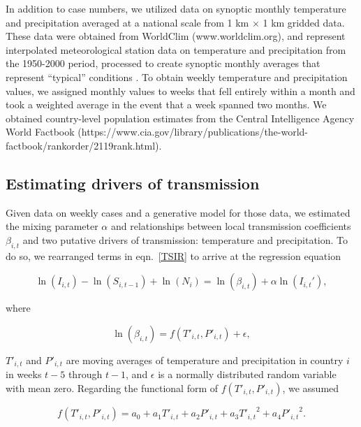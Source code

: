 \documentclass[11pt]{article}
\begin{document}
In addition to case numbers, we utilized data on synoptic monthly temperature and precipitation averaged at a national scale from 1 km $\times$ 1 km gridded data. These data were obtained from WorldClim (www.worldclim.org), and represent interpolated meteorological station data on temperature and precipitation from the 1950-2000 period, processed to create synoptic monthly averages that represent ``typical'' conditions \cite{Hijmans2005}. To obtain weekly temperature and precipitation values, we assigned monthly values to weeks that fell entirely within a month and took a weighted average in the event that a week spanned two months. We obtained country-level population estimates from the Central Intelligence Agency World Factbook (https://www.cia.gov/library/publications/the-world-factbook/rankorder/2119rank.html).

\subsection*{Estimating drivers of transmission}
Given data on weekly cases and a generative model for those data, we estimated the mixing parameter $\alpha$ and relationships between local transmission coefficients $\beta_{i,t}$ and two putative drivers of transmission: temperature and precipitation. To do so, we rearranged terms in eqn.~\eqref{TSIR} to arrive at the regression equation

\vspace{-11pt}
\begin{equation}
\ln(I_{i,t}) - \ln (S_{i,t-1}) + \ln (N_i) = \ln(\beta_{i,t}) + \alpha \ln (I_{i,t}'),
\label{regression}
\end{equation}

\noindent where

\vspace{-11pt}
\begin{equation}
\ln(\beta_{i,t}) = f(T'_{i,t},P'_{i,t}) + \epsilon,
\end{equation}

\noindent $T'_{i,t}$ and $P'_{i,t}$ are moving averages of temperature and precipitation in country $i$ in weeks $t-5$ through $t-1$, and $\epsilon$ is a normally distributed random variable with mean zero. Regarding the functional form of $f(T'_{i,t},P'_{i,t})$, we assumed

\vspace{-11pt}
\begin{equation}
f(T'_{i,t},P'_{i,t}) = a_0 + a_1 T'_{i,t} + a_2 P'_{i,t} + a_3 {T'_{i,t}}^2 + a_4 {P'_{i,t}}^2.
\label{functionalform}
\end{equation}
\end{document}
